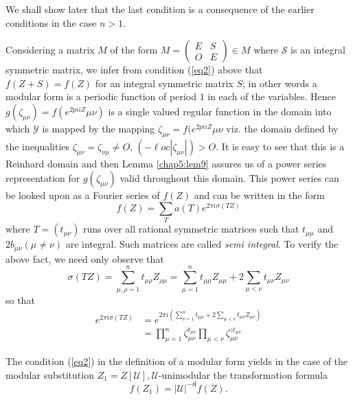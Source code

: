We shall show later that the last condition is a consequence of  the
earlier conditions in the case $n> 1$. 

Considering a matrix $M$ of the form $M= \begin{pmatrix} E&S
  \\O&E \end{pmatrix} \in M$ where $\mathcal{S}$ is an integral
symmetric matrix, we infer from condition  (\ref{eq2}) above that
$f(Z+S)=f(Z)$ for an integral symmetric matrix $S$; in other words a
modular form is a periodic function of period $1$ in each of the
variables. Hence $g(\zeta _{\mu \nu})=f (e^{2pi i Z} \mu \nu)$ is a
single valued regular function in the domain into which $\mathscr{Y}$
is mapped by the mapping $\zeta _{\mu \nu}=f (e^{2pi i Z} \mu \nu$
viz. the domain defined by the inequalities $\zeta_{\mu \nu}=
\zeta_{\nu \mu}\neq O$, $(- \ell oc |\zeta_{\mu \nu}|)>O$. It is easy to
see that this is a Reinhard domain and then Lemma \ref{chap5:lem9}
assures us of a 
power series representation for $g(\zeta_{\mu \nu})$ valid throughout
this domain. This power series can be looked upon as a Fourier series
of $f(Z)$ and can be written in the form 
\begin{equation*}
f(Z)= \sum _T a (T) e^{2 \pi i \sigma(TZ)} \tag{93}\label{eq93}
\end{equation*}
where $T=(t_{\mu \nu})$ runs over all rational symmetric matrices such
that $t_{\mu \mu}$ and $2 b_{\mu \nu}(\mu \neq \nu)$ are
integral. Such matrices are called \textit{semi integral}. To verify
the above fact, we need only observe that 
$$ 
\sigma (TZ)=\sum ^n _{\mu ,\rho =1} t_{\mu \rho} Z_{\rho \mu}= \sum ^n
_{\mu  =1} t_{\mu \mu} Z_{\mu \mu} +2 \sum _{\mu <\nu} t_{\mu \nu}
Z_{\mu \nu} 
$$
so that\pageoriginale
\begin{align*}
e^{2 \pi i \sigma (T Z)} & = e^{2 \pi i (\sum^n_{\nu =1} t_{\mu\mu} + 2 \sum_{\mu
    < \nu} t_{\mu \nu}Z_{\mu \nu})}\\ 
&= \prod^n _{\mu=1} \zeta^{t_{\mu \nu}}_{\mu \nu} \prod\limits_{\mu < \nu}
\zeta^{zt_{\mu \nu}}_{\mu \nu} 
\end{align*}

The condition (\ref{eq2}) in the definition of a modular form yields in the
case of the modular substitution
$Z_1=Z[\mathcal{U}],\mathcal{U}$-unimodular the transformation formula 
\begin{equation*}
f(Z_1)= |\mathcal{U}|^{-\mathfrak{K}}f(Z). \tag{94}\label{eq94}
\end{equation*}


